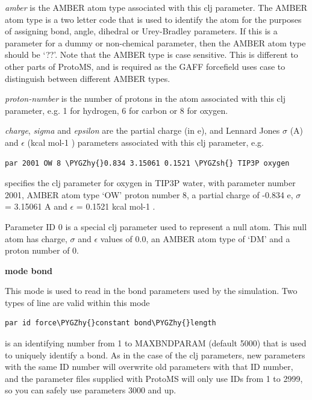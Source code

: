 \documentclass[letterpaper,10pt,english]{sphinxmanual}
\def\PYGZsh{\char`\#}
\def\PYGZhy{\char`\-}
\begin{document}
\emph{amber} is the AMBER atom type associated with this clj parameter. The AMBER atom type is a two letter code that is used to identify the atom for the purposes of assigning bond, angle, dihedral or Urey-Bradley parameters. If this is a parameter for a dummy or non-chemical parameter, then the AMBER atom type should be ‘??’. Note that the AMBER type is case sensitive. This is different to other parts of ProtoMS, and is required as the GAFF forcefield uses case to distinguish between different AMBER types.

\emph{proton-number} is the number of protons in the atom associated with this clj parameter, e.g. 1 for hydrogen, 6 for carbon or 8 for oxygen.

\emph{charge}, \emph{sigma} and \emph{epsilon} are the partial charge (in \textbar{}e\textbar{}), and Lennard Jones \(\sigma\) (A) and \(\epsilon\) (kcal mol-1 ) parameters associated with this clj parameter, e.g.

\begin{Verbatim}[frame=single,commandchars=\\\{\}]
par 2001 OW 8 \PYGZhy{}0.834 3.15061 0.1521 \PYGZsh{} TIP3P oxygen
\end{Verbatim}

specifies the clj parameter for oxygen in TIP3P water, with parameter number 2001, AMBER atom type ‘OW’ proton number 8, a partial charge of -0.834 \textbar{}e\textbar{}, \(\sigma\) = 3.15061 A and \(\epsilon\) = 0.1521 kcal mol-1 .

Parameter ID 0 is a special clj parameter used to represent a null atom. This null atom has charge, \(\sigma\) and \(\epsilon\) values of 0.0, an AMBER atom type of ‘DM’ and a proton number of 0.

\textbf{mode bond}

This mode is used to read in the bond parameters used by the simulation. Two types of line are valid within this mode

\begin{Verbatim}[frame=single,commandchars=\\\{\}]
par id force\PYGZhy{}constant bond\PYGZhy{}length
\end{Verbatim}

 is an identifying number from 1 to MAXBNDPARAM (default 5000) that is used to uniquely identify a bond. As in the case of the clj parameters, new parameters with the same ID number will overwrite old parameters with that ID number, and the parameter files supplied with ProtoMS will only use IDs from 1 to 2999, so you can safely use parameters 3000 and up.
\end{document}
